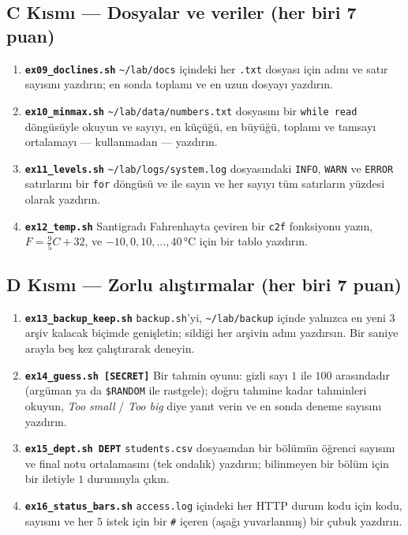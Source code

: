 \subsection*{C Kısmı --- Dosyalar ve veriler (her biri 7 puan)}
\begin{enumerate}[leftmargin=1.6em,resume]
  \item \textbf{\texttt{ex09\_doclines.sh}} \texttt{\textasciitilde/lab/docs} içindeki her \texttt{.txt} dosyası için adını ve satır sayısını yazdırın; en sonda toplamı ve en uzun dosyayı yazdırın.
  \item \textbf{\texttt{ex10\_minmax.sh}} \texttt{\textasciitilde/lab/data/numbers.txt} dosyasını bir \texttt{while read} döngüsüyle okuyun ve sayıyı, en küçüğü, en büyüğü, toplamı ve tamsayı ortalamayı ---  kullanmadan --- yazdırın.
  \item \textbf{\texttt{ex11\_levels.sh}} \texttt{\textasciitilde/lab/logs/system.log} dosyasındaki \texttt{INFO}, \texttt{WARN} ve \texttt{ERROR} satırlarını bir \texttt{for} döngüsü ve  ile sayın ve her sayıyı tüm satırların yüzdesi olarak yazdırın.
  \item \textbf{\texttt{ex12\_temp.sh}} Santigradı Fahrenhayta çeviren bir \texttt{c2f} fonksiyonu yazın, $F = \frac{9}{5}C + 32$, ve $-10, 0, 10, \ldots, 40$\,°C için bir tablo yazdırın.
\end{enumerate}

\subsection*{D Kısmı --- Zorlu alıştırmalar (her biri 7 puan)}
\begin{enumerate}[leftmargin=1.6em,resume]
  \item \textbf{\texttt{ex13\_backup\_keep.sh}} \texttt{backup.sh}'yi, \texttt{\textasciitilde/lab/backup} içinde yalnızca en yeni $3$ arşiv kalacak biçimde genişletin; sildiği her arşivin adını yazdırsın. Bir saniye arayla beş kez çalıştırarak deneyin.
  \item \textbf{\texttt{ex14\_guess.sh [SECRET]}} Bir tahmin oyunu: gizli sayı $1$ ile $100$ arasındadır (argüman ya da \texttt{\$RANDOM} ile rastgele); doğru tahmine kadar tahminleri okuyun, \emph{Too small} / \emph{Too big} diye yanıt verin ve en sonda deneme sayısını yazdırın.
  \item \textbf{\texttt{ex15\_dept.sh DEPT}} \texttt{students.csv} dosyasından bir bölümün öğrenci sayısını ve final notu ortalamasını (tek ondalık) yazdırın; bilinmeyen bir bölüm için bir iletiyle $1$ durumuyla çıkın.
  \item \textbf{\texttt{ex16\_status\_bars.sh}} \texttt{access.log} içindeki her HTTP durum kodu için kodu, sayısını ve her $5$ istek için bir \texttt{\#} içeren (aşağı yuvarlanmış) bir çubuk yazdırın.
\end{enumerate}

